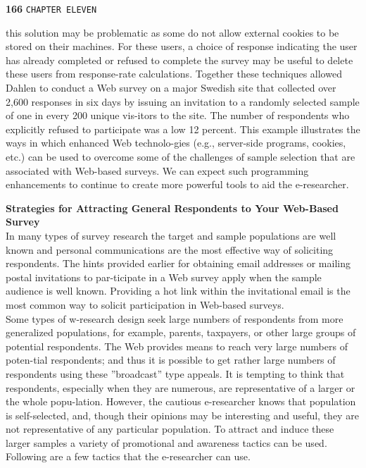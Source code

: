 \documentclass[a4,12pt]{book}
\begin{document}
\begin{flushleft}
\textbf{166}\hspace*{1cm} \texttt{CHAPTER ELEVEN}
\end{flushleft}

\vspace*{1cm}
this solution may be problematic as some do not allow external cookies to be stored on their machines. For these users, a choice of response indicating the user has already completed or refused to complete the survey may be useful to delete these users from response-rate calculations. Together these techniques allowed Dahlen to conduct a Web survey on a major Swedish site that collected over 2,600 responses in six days by issuing an invitation to a randomly selected sample of one in every 200 unique vis-itors to the site. The number of respondents who explicitly refused to participate was a low 12 percent. This example illustrates the ways in which enhanced Web technolo-gies (e.g., server-side programs, cookies, etc.) can be used to overcome some of the challenges of sample selection that are associated with Web-based surveys. We can expect such programming enhancements to continue to create more powerful tools to aid the e-researcher.\\

\vspace*{0.5cm}

\textbf{Strategies for Attracting General Respondents to Your Web-Based Survey}\\

\vspace*{0.2cm}
In many types of survey research the target and sample populations are well known and personal communications are the most effective way of soliciting respondents. The hints provided earlier for obtaining email addresses or mailing postal invitations to par-ticipate in a Web survey apply when the sample audience is well known. Providing a hot link within the invitational email is the most common way to solicit participation in Web-based surveys.\\

\hspace*{0.5cm} Some types of w-research design seek large numbers of respondents from more generalized populations, for example, parents, taxpayers, or other large groups of potential respondents. The Web provides means to reach very large numbers of poten-tial respondents; and thus it is possible to get rather large numbers of respondents using these ''broadcast'' type appeals. It is tempting to think that respondents, especially when they are numerous, are representative of a larger or the whole popu-lation. However, the cautious e-researcher knows that population is self-selected, and, though their opinions may be interesting and useful, they are not representative of any particular population. To attract and induce these larger samples a variety of promotional and awareness tactics can be used. Following are a few tactics that the e-researcher can use.\\
\end{document}
